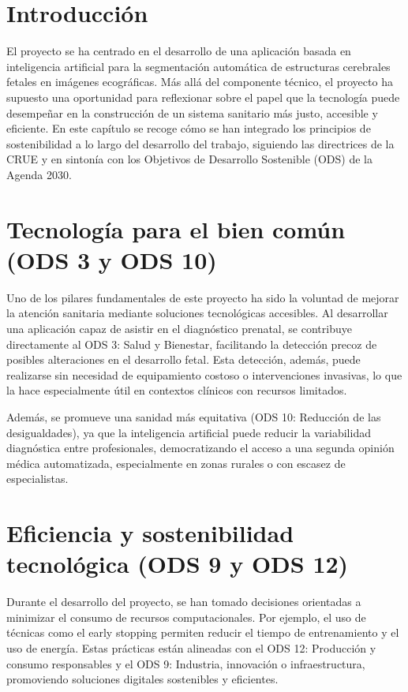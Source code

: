 
\section{Introducción}
El proyecto se ha centrado en el desarrollo de una aplicación basada en inteligencia artificial para la segmentación automática de estructuras cerebrales fetales en imágenes ecográficas. Más allá del componente técnico, el proyecto ha supuesto una oportunidad para reflexionar sobre el papel que la tecnología puede desempeñar en la construcción de un sistema sanitario más justo, accesible y eficiente. En este capítulo se recoge cómo se han integrado los principios de sostenibilidad a lo largo del desarrollo del trabajo, siguiendo las directrices de la CRUE y en sintonía con los Objetivos de Desarrollo Sostenible (ODS) de la Agenda 2030.

\section{Tecnología para el bien común (ODS 3 y ODS 10)}
Uno de los pilares fundamentales de este proyecto ha sido la voluntad de mejorar la atención sanitaria mediante soluciones tecnológicas accesibles. Al desarrollar una aplicación capaz de asistir en el diagnóstico prenatal, se contribuye directamente al ODS 3: Salud y Bienestar, facilitando la detección precoz de posibles alteraciones en el desarrollo fetal. Esta detección, además, puede realizarse sin necesidad de equipamiento costoso o intervenciones invasivas, lo que la hace especialmente útil en contextos clínicos con recursos limitados.

Además, se promueve una sanidad más equitativa (ODS 10: Reducción de las desigualdades), ya que la inteligencia artificial puede reducir la variabilidad diagnóstica entre profesionales, democratizando el acceso a una segunda opinión médica automatizada, especialmente en zonas rurales o con escasez de especialistas.
\section{Eficiencia y sostenibilidad tecnológica (ODS 9 y ODS 12)}
Durante el desarrollo del proyecto, se han tomado decisiones orientadas a minimizar el consumo de recursos computacionales. Por ejemplo, el uso de técnicas como el early stopping permiten reducir el tiempo de entrenamiento y el uso de energía. Estas prácticas están alineadas con el ODS 12: Producción y consumo responsables y el ODS 9: Industria, innovación o infraestructura, promoviendo soluciones digitales sostenibles y eficientes.

